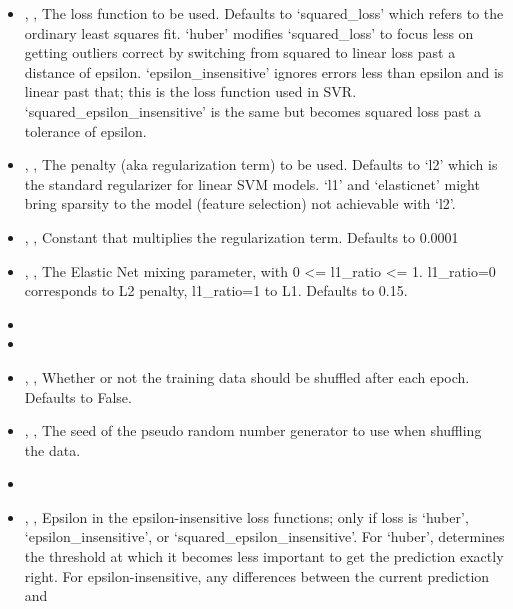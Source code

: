 \begin{itemize}
  \item {} , ,
  The loss function to be used.
  Defaults to ‘squared\_loss’ which refers to the ordinary
  least squares fit.
  ‘huber’ modifies ‘squared\_loss’ to focus less on
  getting outliers correct by switching from squared to linear loss past a
  distance of epsilon.
  ‘epsilon\_insensitive’ ignores errors less than epsilon and
  is linear past that; this is the loss function used in SVR.
  ‘squared\_epsilon\_insensitive’ is the same
  but becomes squared loss past a tolerance of epsilon.
  \item {} , ,
  The penalty (aka regularization term) to be used.
  Defaults to ‘l2’ which is the standard regularizer for linear SVM models.
  ‘l1’ and ‘elasticnet’ might bring sparsity to the model (feature
  selection) not achievable with ‘l2’.
  \item {} , ,
  Constant that multiplies the regularization term.
  Defaults to 0.0001
  \item {} , ,
  The Elastic Net mixing parameter, with 0 <= l1\_ratio <= 1.
  l1\_ratio=0 corresponds to L2 penalty, l1\_ratio=1
  to L1.
  Defaults to 0.15.
  \item {}
  \item {}
  \item {} , ,
  Whether or not the training data should be shuffled after each epoch.
  Defaults to False.
  \item {} , ,
  The seed of the pseudo random number generator to use when shuffling the data.
  \item \verDescriptionB
  \item {} , ,
  Epsilon in the epsilon-insensitive loss functions; only if loss is
  ‘huber’, ‘epsilon\_insensitive’, or
  ‘squared\_epsilon\_insensitive’.
  For ‘huber’, determines the threshold at which it becomes less important
  to get the prediction exactly right.
  For epsilon-insensitive, any differences between the current prediction and

\end{itemize}

